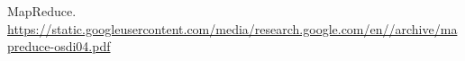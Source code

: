 \documentclass{article}
\begin{document}
\begin{thebibliography}{}
\raggedright

MapReduce.
\href{https://static.googleusercontent.com/media/research.google.com/en//archive/mapreduce-osdi04.pdf}{https://static.googleusercontent.com/media/research.google.com/en//archive/mapreduce-osdi04.pdf}

\end{thebibliography}
\end{document}
